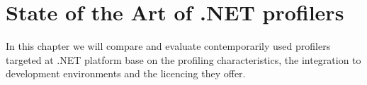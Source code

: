 \chapter{State of the Art of .NET profilers}

In this chapter we will compare and evaluate contemporarily used profilers targeted at .NET platform base on the profiling characteristics, the integration to development environments and the licencing they offer.



